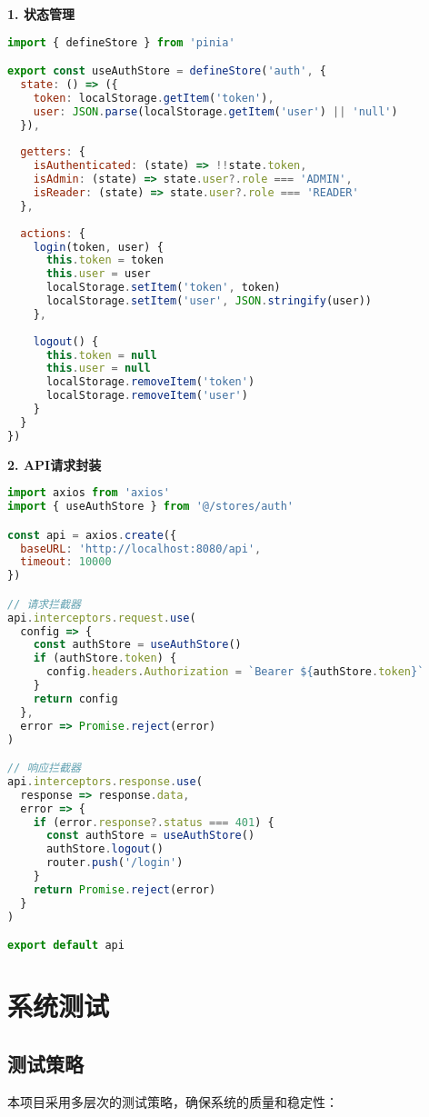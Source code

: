 \documentclass[12pt,a4paper]{article}
\begin{document}
\textbf{1. 状态管理}
\begin{lstlisting}[language=javascript]
import { defineStore } from 'pinia'

export const useAuthStore = defineStore('auth', {
  state: () => ({
    token: localStorage.getItem('token'),
    user: JSON.parse(localStorage.getItem('user') || 'null')
  }),
  
  getters: {
    isAuthenticated: (state) => !!state.token,
    isAdmin: (state) => state.user?.role === 'ADMIN',
    isReader: (state) => state.user?.role === 'READER'
  },
  
  actions: {
    login(token, user) {
      this.token = token
      this.user = user
      localStorage.setItem('token', token)
      localStorage.setItem('user', JSON.stringify(user))
    },
    
    logout() {
      this.token = null
      this.user = null
      localStorage.removeItem('token')
      localStorage.removeItem('user')
    }
  }
})
\end{lstlisting}

\textbf{2. API请求封装}
\begin{lstlisting}[language=javascript]
import axios from 'axios'
import { useAuthStore } from '@/stores/auth'

const api = axios.create({
  baseURL: 'http://localhost:8080/api',
  timeout: 10000
})

// 请求拦截器
api.interceptors.request.use(
  config => {
    const authStore = useAuthStore()
    if (authStore.token) {
      config.headers.Authorization = `Bearer ${authStore.token}`
    }
    return config
  },
  error => Promise.reject(error)
)

// 响应拦截器
api.interceptors.response.use(
  response => response.data,
  error => {
    if (error.response?.status === 401) {
      const authStore = useAuthStore()
      authStore.logout()
      router.push('/login')
    }
    return Promise.reject(error)
  }
)

export default api
\end{lstlisting}

\section{系统测试}

\subsection{测试策略}
本项目采用多层次的测试策略，确保系统的质量和稳定性：
\end{document}
